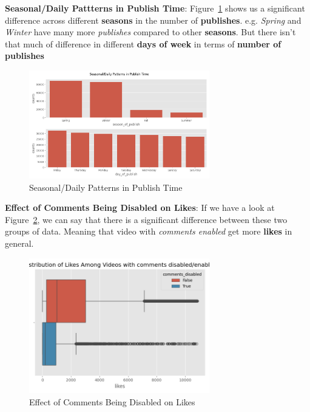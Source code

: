 \documentclass[a4paper,12pt]{article}
\begin{document}
\noindent \textbf{Seasonal/Daily Pattterns in Publish Time}: Figure~\ref{fig:Figure_12} shows us a significant difference across different \textbf{seasons} in the number of \textbf{publishes}. e.g. \textit{Spring} and \textit{Winter} have 
many more \textit{publishes} compared to other \textbf{seasons}. But there isn't that much of difference in different \textbf{days of week} in terms of \textbf{number of publishes} 

\begin{figure}[H]
    \centering
    \includegraphics[width=0.7\textwidth]{./images/seasonal_daily_patterns_in_publish_time.png}
    \caption{Seasonal/Daily Patterns in Publish Time}
    \label{fig:Figure_12}
\end{figure}


\noindent \textbf{Effect of Comments Being Disabled on Likes}: If we have a look at Figure~\ref{fig:Figure_13}, we can say that there is a significant difference between these two groups of data. Meaning that 
video with \textit{comments enabled} get more \textbf{likes} in general.

\begin{figure}[H]
    \centering
    \includegraphics[width=0.7\textwidth]{./images/distro_of_likes_among_vids_with_cmnt_dis_enb.png}
    \caption{Effect of Comments Being Disabled on Likes}
    \label{fig:Figure_13}
\end{figure}
\end{document}
